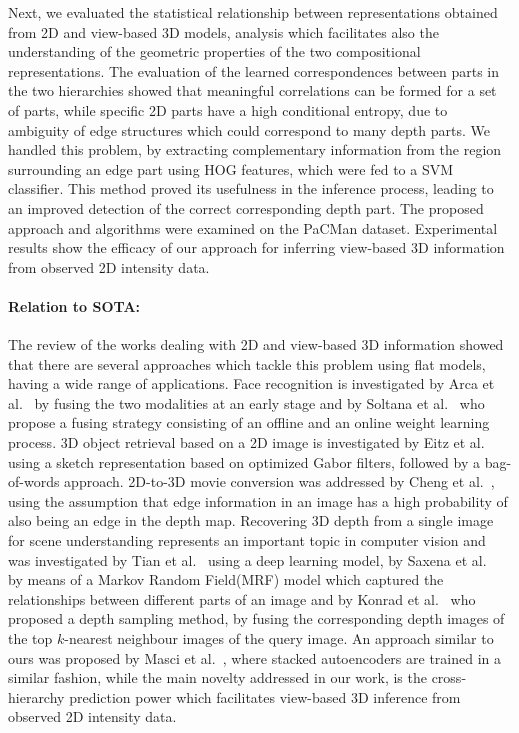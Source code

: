 \documentclass[a4paper,11pt,pdf]{../templates/pacmanreport}
\begin{document}
Next, we evaluated the statistical relationship between representations obtained from 2D and view-based 3D models, analysis which facilitates also the understanding of the geometric properties of the two compositional representations. The evaluation of the learned correspondences between parts in the two hierarchies showed that meaningful correlations can be formed for a set of parts, while specific 2D parts have a high conditional entropy, due to ambiguity of edge structures which could correspond to many depth parts. We handled this problem, by extracting complementary information from the region surrounding an edge part using HOG features, which were fed to a SVM classifier. This method proved its usefulness in the inference process, leading to an improved detection of the correct corresponding depth part. The proposed approach and algorithms were examined on the PaCMan dataset. Experimental results show the efficacy of our approach for inferring view-based 3D information from observed 2D intensity data. 

\paragraph{Relation to SOTA:} 

The review of the works dealing with 2D and view-based 3D information showed that there are several approaches which tackle this problem using flat models, having a wide range of applications. Face recognition is investigated by Arca et al.~\cite{Arca2007} by fusing the two modalities at an early stage and by Soltana et al.~\cite{Soltana2010} who propose a fusing strategy consisting of an offline and an online weight learning process. 3D object retrieval based on a 2D image is investigated by Eitz et al.~\cite{Eitz2012} using a sketch representation based on optimized Gabor filters, followed by a bag-of-words approach. 2D-to-3D movie conversion was addressed by Cheng et al.~\cite{Cheng2010}, using the assumption that edge information in an image has a high probability of also being an edge in the depth map.
Recovering 3D depth from a single image for scene understanding represents an important topic in computer vision and was investigated by Tian et al.~\cite{Tian2014} using a deep learning model, by Saxena et al.~\cite{Saxena2009} by means of a Markov Random Field(MRF) model which captured the relationships between different parts of an image and by Konrad et al.~\cite{Konrad2012} who proposed a depth sampling method, by fusing the corresponding depth images of the top $k$-nearest neighbour images of the query image.
An approach similar to ours was proposed by Masci et al.~\cite{Masci2011}, where stacked autoencoders are trained in a similar fashion, while the main novelty addressed in our work, is the cross-hierarchy prediction power which facilitates view-based 3D inference from observed 2D intensity data.
\end{document}
